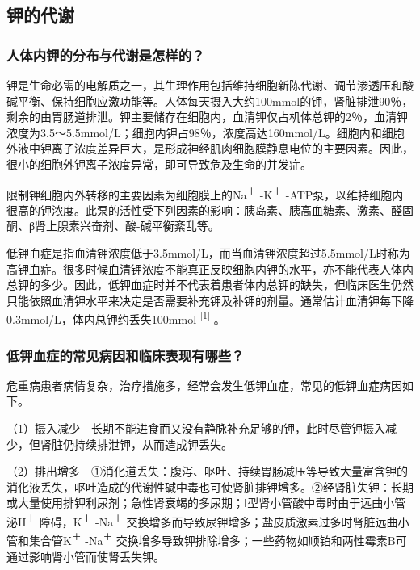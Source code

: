 \subsection{钾的代谢}

\subsubsection{人体内钾的分布与代谢是怎样的？}

钾是生命必需的电解质之一，其生理作用包括维持细胞新陈代谢、调节渗透压和酸碱平衡、保持细胞应激功能等。人体每天摄入大约100mmol的钾，肾脏排泄90％，剩余的由胃肠道排泄。钾主要储存在细胞内，血清钾仅占机体总钾的2％，血清钾浓度为3.5～5.5mmol/L；细胞内钾占98％，浓度高达160mmol/L。细胞内和细胞外液中钾离子浓度差异巨大，是形成神经肌肉细胞膜静息电位的主要因素。因此，很小的细胞外钾离子浓度异常，即可导致危及生命的并发症。

限制钾细胞内外转移的主要因素为细胞膜上的Na\textsuperscript{＋}
-K\textsuperscript{＋}
-ATP泵，以维持细胞内很高的钾浓度。此泵的活性受下列因素的影响：胰岛素、胰高血糖素、激素、醛固酮、β肾上腺素兴奋剂、酸-碱平衡紊乱等。

低钾血症是指血清钾浓度低于3.5mmol/L，而当血清钾浓度超过5.5mmol/L时称为高钾血症。很多时候血清钾浓度不能真正反映细胞内钾的水平，亦不能代表人体内总钾的多少。因此，低钾血症时并不代表着患者体内总钾的缺失，但临床医生仍然只能依照血清钾水平来决定是否需要补充钾及补钾的剂量。通常估计血清钾每下降0.3mmol/L，体内总钾约丢失100mmol
\protect\hyperlink{text00025.htmlux5cux23ch1-24}{\textsuperscript{{[}1{]}}}
。

\subsubsection{低钾血症的常见病因和临床表现有哪些？}

危重病患者病情复杂，治疗措施多，经常会发生低钾血症，常见的低钾血症病因如下。

（1）摄入减少　长期不能进食而又没有静脉补充足够的钾，此时尽管钾摄入减少，但肾脏仍持续排泄钾，从而造成钾丢失。

（2）排出增多　①消化道丢失：腹泻、呕吐、持续胃肠减压等导致大量富含钾的消化液丢失，呕吐造成的代谢性碱中毒也可使肾脏排钾增多。②经肾脏失钾：长期或大量使用排钾利尿剂；急性肾衰竭的多尿期；Ⅰ型肾小管酸中毒时由于远曲小管泌H\textsuperscript{＋}
障碍，K\textsuperscript{＋} -Na\textsuperscript{＋}
交换增多而导致尿钾增多；盐皮质激素过多时肾脏远曲小管和集合管K\textsuperscript{＋}
-Na\textsuperscript{＋}
交换增多导致钾排除增多；一些药物如顺铂和两性霉素B可通过影响肾小管而使肾丢失钾。

